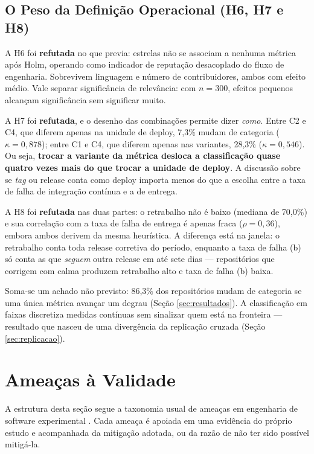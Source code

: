 \documentclass[12pt]{article}
\begin{document}
\subsection{O Peso da Definição Operacional (H6, H7 e H8)}

A H6 foi \textbf{refutada} no que previa: estrelas não se associam a nenhuma métrica após
Holm, operando como indicador de reputação desacoplado do fluxo de engenharia. Sobrevivem
linguagem e número de contribuidores, ambos com efeito médio. Vale separar significância de
relevância: com $n = 300$, efeitos pequenos alcançam significância sem significar muito.

A H7 foi \textbf{refutada}, e o desenho das combinações permite dizer \emph{como}. Entre C2 e
C4, que diferem apenas na unidade de deploy, 7,3\% mudam de categoria
($\kappa = 0{,}878$); entre C1 e C4, que diferem apenas nas variantes, 28,3\%
($\kappa = 0{,}546$). Ou seja, \textbf{trocar a variante da métrica desloca a classificação
quase quatro vezes mais do que trocar a unidade de deploy}. A discussão sobre se \emph{tag} ou
release conta como deploy importa menos do que a escolha entre a taxa de falha de integração contínua e a de entrega.

A H8 foi \textbf{refutada} nas duas partes: o retrabalho não é baixo (mediana de 70,0\%) e sua
correlação com a taxa de falha de entrega é apenas fraca ($\rho = 0{,}36$), embora ambos derivem da
mesma heurística. A diferença está na janela: o retrabalho conta toda release corretiva do
período, enquanto a taxa de falha (b) só conta as que \emph{seguem} outra release em até sete dias ---
repositórios que corrigem com calma produzem retrabalho alto e taxa de falha (b) baixa.

Soma-se um achado não previsto: 86,3\% dos repositórios mudam de categoria se uma única
métrica avançar um degrau (Seção \ref{sec:resultados}). A classificação em faixas discretiza
medidas contínuas sem sinalizar quem está na fronteira --- resultado que nasceu de uma
divergência da replicação cruzada (Seção \ref{sec:replicacao}).

\section{Ameaças à Validade}
\label{sec:ameacas}

A estrutura desta seção segue a taxonomia usual de ameaças em engenharia de software
experimental \cite{wohlin2012}. Cada ameaça é apoiada em uma evidência do próprio estudo e
acompanhada da mitigação adotada, ou da razão de não ter sido possível mitigá-la.
\end{document}
